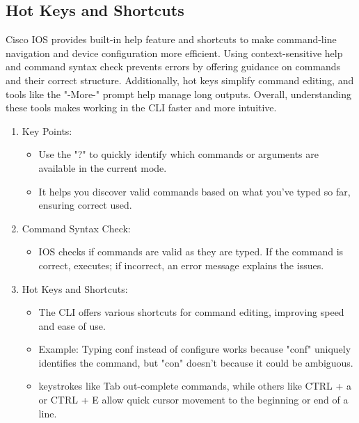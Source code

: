 \documentclass[a4paper,11pt]{article}
\begin{document}
\subsection{Hot Keys and Shortcuts}
Cisco IOS provides built-in help feature and shortcuts to make command-line navigation and device configuration more efficient. Using context-sensitive help and command syntax check prevents errors by offering guidance on commands and their correct structure. Additionally, hot keys simplify command editing, and tools like the "\--More\--" prompt help manage long outputs. Overall, understanding these tools makes working in the CLI faster and more intuitive.\\
\begin{enumerate}
    \item Key Points: 
    \begin{itemize}
        \item Use the "?" to quickly identify which commands or arguments are available in the current mode.\\
        \item It helps you discover valid commands based on what you've typed so far, ensuring correct used.\\ 
    \end{itemize}
    \item Command Syntax Check:\\
    \begin{itemize}
        \item IOS checks if commands are valid as they are typed. If the command is correct, executes; if incorrect, an error message explains the issues.\\
    \end{itemize}
    \item Hot Keys and Shortcuts:\\
    \begin{itemize}
        \item The CLI offers various shortcuts for command editing, improving speed and ease of use.\\
        \item Example: Typing conf instead of configure works because "conf" uniquely identifies the command, but "con"  doesn't because it could be ambiguous.\\
        \item keystrokes like Tab out-complete commands, while others like CTRL + a or CTRL + E allow quick cursor movement to the beginning or end of a line.\\

\end{itemize}
\end{enumerate}
\end{document}
